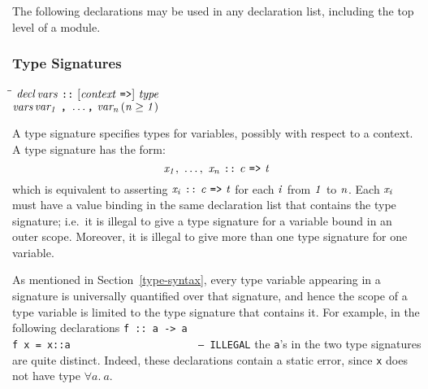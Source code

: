 The following declarations may be used in any declaration list,
including the top level of a module.

\subsubsection{Type Signatures}
\label{type-signatures}

\begin{flushleft}\it\begin{tabbing}
\hspace{0.5in}\=\hspace{3.0in}\=\kill
$\it decl$\>\makebox[3.5em]{$\rightarrow$}$\it vars\ \makebox{\tt ::}\ [context\ \makebox{\tt =>}]\ type$\\ 
$\it vars$\>\makebox[3.5em]{$\rightarrow$}$\it var_1\ \makebox{\tt ,}\ \ldots \makebox{\tt ,}\ var_n$\>\makebox[3em]{}$\it (n\geq 1)$
\end{tabbing}\end{flushleft}
%
%
A type signature specifies types for variables, possibly with respect
to a context.  A type signature has the form:
\[
\mbox{$\it x_1,\ \ldots ,\ x_n\ \makebox{\tt ::}\ c\ \makebox{\tt =>}\ t$}
\]
which is equivalent to asserting
\mbox{$\it x_i\ \makebox{\tt ::}\ c\ \makebox{\tt =>}\ t$}
for each \mbox{$\it i$} from \mbox{$\it 1$} to \mbox{$\it n$}.  Each \mbox{$\it x_i$} must have a value binding in
the same declaration list that contains the type signature; i.e.~it is
illegal to give a type signature for a variable bound in an
outer scope.
Moreover, it is illegal to give more than one type
signature for one variable.

As mentioned in Section~\ref{type-syntax},
every type variable appearing in a signature
is universally quantified over that signature, and hence
the scope of a type variable is limited to the type
signature that contains it.  For example, in the following
declarations
\bprog
\mbox{\tt f\ ::\ a\ ->\ a}\\
\mbox{\tt f\ x\ =\ x::a\ \ \ \ \ \ \ \ \ \ \ \ \ \ \ \ \ \ \ \ \ \ --\ ILLEGAL}
\eprog
the \mbox{\tt a}'s in the two type signatures are quite distinct.  Indeed,
these declarations contain a static error, since \mbox{\tt x} does not have
type $\forall a.~a$.

